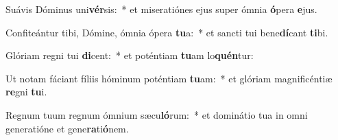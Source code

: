 \item Suávis Dóminus uni\textbf{vér}sis:~* et miseratiónes ejus super ómnia \textbf{ó}pera \textbf{e}jus.
\item Confiteántur tibi, Dómine, ómnia ópera \textbf{tu}a:~* et sancti tui bene\textbf{dí}cant \textbf{ti}bi.
\item Glóriam regni tui \textbf{di}cent:~* et poténtiam \textbf{tu}am lo\textbf{quén}tur:
\item Ut notam fáciant fíliis hóminum poténtiam \textbf{tu}am:~* et glóriam magnificéntiæ \textbf{re}gni \textbf{tu}i.
\item Regnum tuum regnum ómnium sæcu\textbf{ló}rum:~* et dominátio tua in omni generatióne et gene\textbf{ra}ti\textbf{ó}nem.

